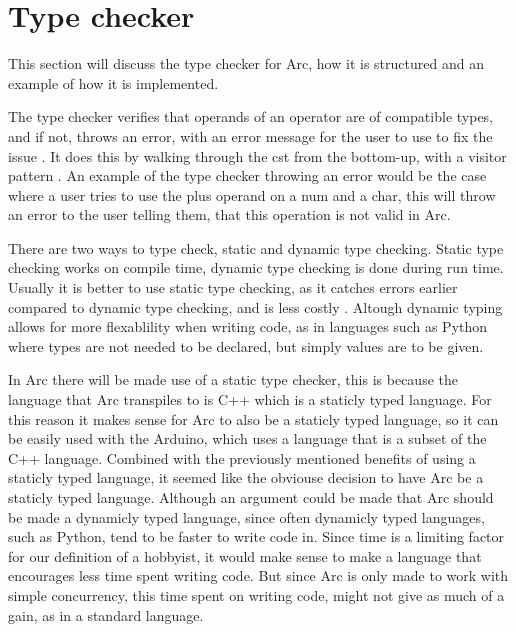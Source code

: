 \section{Type checker}
This section will discuss the type checker for Arc, how it is structured and an example of how it is implemented.

The type checker verifies that operands of an operator are of compatible types, and if not, throws an error, with an error message for the user to use to fix the issue \cite{Sebesta2016}. It does this by walking through the \gls{cst} from the bottom-up, with a visitor pattern \cite{Parr2014}. An example of the type checker throwing an error would be the case where a user tries to use the plus operand on a num and a char, this will throw an error to the user telling them, that this operation is not valid in Arc.

There are two ways to type check, static and dynamic type checking. Static type checking works on compile time, dynamic type checking is done during run time. Usually it is better to use static type checking, as it catches errors earlier compared to dynamic type checking, and is less costly \cite{Sebesta2016}. Altough dynamic typing allows for more flexablility when writing code, as in languages such as Python where types are not needed to be declared, but simply values are to be given.

In Arc there will be made use of a static type checker, this is because the language that Arc transpiles to is C++ which is a staticly typed language. For this reason it makes sense for Arc to also be a staticly typed language, so it can be easily used with the Arduino, which uses a language that is a subset of the C++ language.  Combined with the previously mentioned benefits of using a staticly typed language, it seemed like the obviouse decision to have Arc be a staticly typed language. Although an argument could be made that Arc should be made a dynamicly typed language, since often dynamicly typed languages, such as Python, tend to be faster to write code in. Since time is a limiting factor for our definition of a hobbyist, it would make sense to make a language that encourages less time spent writing code. But since Arc is only made to work with simple concurrency, this time spent on writing code, might not give as much of a gain, as in a standard language. 

